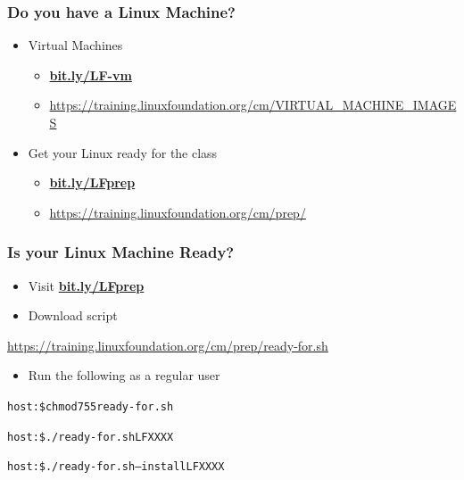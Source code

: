 \documentclass[bigger]{beamer}
\newcommand{\mycourse}{LFXXXX}
\begin{document}
\begin{frame}
	\frametitle{Do you have a Linux Machine?}
	\LARGE
	\begin{itemize} 
		\item Virtual Machines
		\begin{itemize} 
			\item {\Large\textbf{\url{bit.ly/LF-vm}}}
			\item {\small\url{https://training.linuxfoundation.org/cm/VIRTUAL_MACHINE_IMAGES}}
		\end{itemize}
		\vspace{0.5em}
		\item Get your Linux ready for the class
		\begin{itemize} 
			\item {\Large\textbf{\url{bit.ly/LFprep}}}
			\item {\small\url{https://training.linuxfoundation.org/cm/prep/}}
		\end{itemize}
	\end{itemize}
\end{frame}

\begin{frame}
	\frametitle{Is your Linux Machine Ready?}
	\LARGE
	\begin{itemize} 
		\item {\Large{}Visit \textbf{\url{bit.ly/LFprep}}}
		\vspace{0.5em}
		\item Download script
	\end{itemize}
	\vspace{-0.5em}
	{\footnotesize\url{https://training.linuxfoundation.org/cm/prep/ready-for.sh}}
	\vspace{0.5em}
	\begin{itemize} 
		\item Run the following as a regular user
	\end{itemize}
        \large
	\begin{alltt}
host:\$ chmod 755 ready-for.sh \par
host:\$ ./ready-for.sh \mycourse{} \par
host:\$ ./ready-for.sh --install \mycourse{}
	\end{alltt}
\end{frame}
\end{document}
